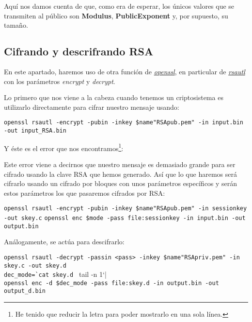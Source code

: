 \documentclass[a4paper, 11pt]{article}
\begin{document}
		Aquí nos damos cuenta de que, como era de esperar, los únicos valores que se transmiten al público son \textbf{Modulus},
		\textbf{PublicExponent} y, por supuesto, su tamaño.
		
	\subsection{Cifrando y descrifrando RSA}
		En este apartado, haremos uso de otra función de \href{http://manpages.ubuntu.com/manpages/zesty/en/man1/openssl.1ssl.html}
		{\textit{openssl}}, en particular de \href{https://www.openssl.org/docs/man1.0.2/apps/rsautl.html}{\textit{rsautl}} con
		los parámetros \textit{encrypt} y \textit{decrypt}.
	
		Lo primero que nos viene a la cabeza cuando tenemos un criptosistema es utilizarlo directamente para cifrar nuestro
		mensaje usando: \\
		\begin{small}
			\verb|openssl rsautl -encrypt -pubin -inkey $name"RSApub.pem" -in input.bin -out input_RSA.bin|
		\end{small}	
		
		Y éste es el error que nos encontramos\footnote{He tenido que reducir la letra para poder mostrarlo en una sola línea.}:
		
		
		Este error viene a decirnos que nuestro mensaje es demasiado grande para ser cifrado usando la clave RSA que hemos
		generado. Así que lo que haremos será cifrarlo usando un cifrado por bloques con unos parámetros específicos y serán
		estos parámetros los que pasaremos cifrados por RSA:
		
		\begin{small}
			\verb|openssl rsautl -encrypt -pubin -inkey $name"RSApub.pem" -in sessionkey -out skey.c|
			\verb|openssl enc $mode -pass file:sessionkey -in input.bin -out output.bin|
		\end{small}
		
		Análogamente, se actúa para descifrarlo:
		
		\begin{small}
			\verb|openssl rsautl -decrypt -passin <pass> -inkey $name"RSApriv.pem" -in skey.c -out skey.d| \\
			\verb|dec_mode=`cat skey.d | tail -n 1`| \\
			\verb|openssl enc -d $dec_mode -pass file:skey.d -in output.bin -out output_d.bin|
		\end{small}
		
\end{document}

